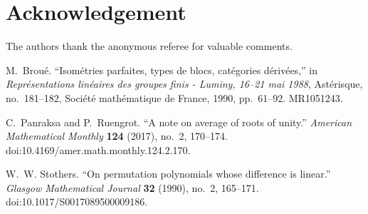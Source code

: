 \documentclass[11pt]{amsart}
\theoremstyle{definition}
\theoremstyle{remark}
\numberwithin{equation}{section}
\begin{document}
\section*{Acknowledgement}
The authors thank the anonymous referee for valuable comments.

\begin{thebibliography}{3}
\raggedright

M.~Brou{\'e}.
\newblock ``Isom{\'e}tries parfaites, types de blocs, cat{\'e}gories
  d{\'e}riv{\'e}es,'' in \emph{Repr{\'e}sentations lin{\'e}aires des
  groupes finis - Luminy, 16--21 mai 1988}, Ast{\'e}risque, no.~181--182,
  Soci{\'e}t{\'e} math{\'e}matique de France, 1990, pp.~61--92.
  MR1051243.

C.~Panraksa and P.~Ruengrot.
\newblock ``A note on average of roots of unity.''
\newblock \emph{American Mathematical Monthly} \textbf{124} (2017), no.~2,
  170--174. doi:10.4169/amer.math.monthly.124.2.170.

W.~W. Stothers.
\newblock ``On permutation polynomials whose difference is linear.''
\newblock \emph{Glasgow Mathematical Journal} \textbf{32} (1990), no.~2,
  165--171. doi:10.1017/S0017089500009186.

\end{thebibliography}
\end{document}
